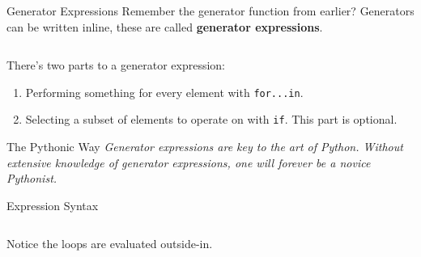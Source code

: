 \documentclass{lug}
\begin{document}
\begin{frame}[fragile]{Generator Expressions}
    Remember the generator function from earlier? Generators can be written
    inline, these are called \textbf{generator expressions}.

    \medskip

    \begin{minipage}{\linewidth}
        \centering
        \inputminted{python3}{examples/generator_basic.py}
    \end{minipage}

    \medskip

    \pause

    There's two parts to a generator expression:
    \begin{enumerate}[<+->]
        \item Performing something for every element with \texttt{for...in}.
        \item Selecting a subset of elements to operate on with \texttt{if}.
            This part is optional.
    \end{enumerate}

    \pause[\thebeamerpauses]

    \medskip

    \begin{block}{The Pythonic Way}
        \small \itshape
        Generator expressions are key to the art of Python. Without extensive
        knowledge of generator expressions, one will forever be a novice
        Pythonist.
    \end{block}

\end{frame}

\begin{frame}{Expression Syntax}
    \inputminted{python3}{examples/generator_syntax.py}
    Notice the loops are evaluated outside-in.
\end{frame}
\end{document}
